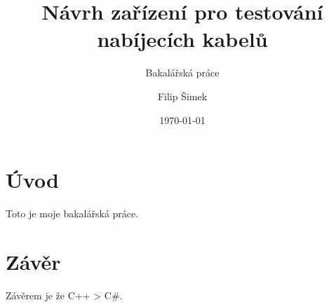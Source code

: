 \documentclass[12pt,a4paper,titlepage]{scrartcl}
\title{\vspace{6cm}Návrh zařízení pro testování nabíjecích kabelů}
\subtitle{Bakalářská práce}
\author{Filip Šimek}
\date{\today}
\begin{document}
%

	\maketitle 

	\tableofcontents
	\newpage
	
	\section {Úvod}
	Toto je moje bakalářská práce.
	
	 \section*{Závěr}
	Závěrem je že C++ > C\#.

	\newpage
	\listoffigures
	\listoftables
	\lstlistoflistings
\end{document}
